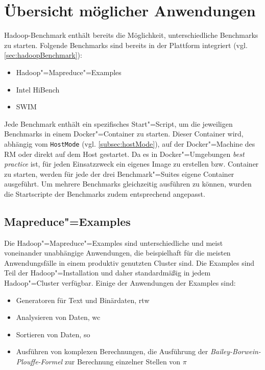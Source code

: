 \section{Übersicht möglicher Anwendungen}
\label{sec:appOverview}

Hadoop-Benchmark enthält bereits die Möglichkeit, unterschiedliche Benchmarks zu starten.
Folgende Benchmarks sind bereits in der Plattform integriert (vgl. \cref{sec:hadoopBenchmark}):

\begin{itemize}
    \item Hadoop"=Mapreduce"=Examples
    \item Intel HiBench
    \item \acrfull{SWIM}
\end{itemize}

Jede Benchmark enthält ein spezifisches Start"=Script, um die jeweiligen Benchmarks in einem Docker"=Container zu starten.
Dieser Container wird, abhängig vom \texttt{HostMode} (vgl. \cref{subsec:hostMode}), auf der Docker"=Machine des \gls{RM} oder direkt auf dem Host gestartet.
Da es in Docker"=Umgebungen \textit{best practice} ist, für jeden Einsatzzweck ein eigenes Image zu erstellen bzw. Container zu starten, werden für jede der drei Benchmark"=Suites eigene Container ausgeführt.
Um mehrere Benchmarks gleichzeitig ausführen zu können, wurden die Startscripte der Benchmarks zudem entsprechend angepasst.

\subsection{Mapreduce"=Examples}
\label{subsec:mapreduceExamples}

Die Hadoop"=Mapreduce"=Examples sind unterschiedliche und meist voneinander unabhängige Anwendungen, die beispielhaft für die meisten Anwendungsfälle in einem produktiv genutzten Cluster sind.
Die Examples sind Teil der Hadoop"=Installation und daher standardmäßig in jedem Hadoop"=Cluster verfügbar.
Einige der Anwendungen der Examples sind:

\begin{itemize}
    \item Generatoren für Text und Binärdaten, \zB \acrlong{rtw}
    \item Analysieren von Daten, \zB \acrlong{wc}
    \item Sortieren von Daten, \zB \acrlong{so}
    \item Ausführen von komplexen Berechnungen, \zB die Ausführung der \emph{Bailey-Borwein-Plouffe-Formel} \cite{Bailey1997} zur Berechnung einzelner Stellen von $\pi$
\end{itemize}

